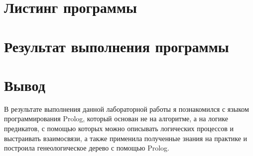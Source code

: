 \documentclass[12pt]{report}
\begin{document}
	\section*{Листинг программы}
	
	
	
	\section*{Результат выполнения программы}
	
	\section*{Вывод}
	В результате выполнения данной лабораторной работы я познакомился с языком программирования Prolog, который основан не на алгоритме, а на логике предикатов, с помощью которых можно описывать логических процессов и выстраивать взаимосвязи, а также применила полученные знания на практике и построила генеологическое дерево с помощью Prolog.
\end{document}

